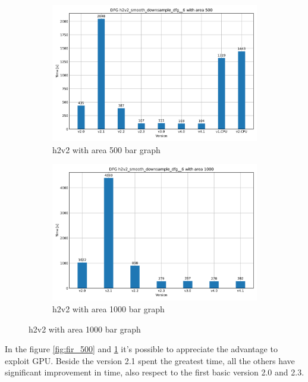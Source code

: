 \begin{figure}[h]
    \centering
    \begin{subfigure}{.45\textwidth}
        \centering
        \includegraphics[width=.95\linewidth]{chapters/figures/h2v2_smooth_downsample_dfg__6_500.png}  
        \caption{h2v2 with area 500 bar graph}
        \label{fig:h2v2_500}
    \end{subfigure}
    \begin{subfigure}{.45\textwidth}
        \centering
        \includegraphics[width=.95\linewidth]{chapters/figures/h2v2_smooth_downsample_dfg__6_1000.png}  
        \caption{h2v2 with area 1000 bar graph}
        \label{fig:h2v2_1000}
    \end{subfigure}
\end{figure}

In the figure \ref{fig:fir_500} and \ref{fig:h2v2_500} it's possible to appreciate the advantage to exploit GPU.
Beside the version 2.1 spent the greatest time, all the others have significant improvement in time, 
also respect to the first basic version 2.0 and 2.3.

